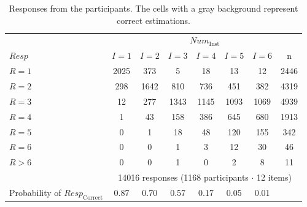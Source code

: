 \begin{table}[t]
\tiny
\begin{tabular}{p{1cm}ccccccc}
\toprule[1.5pt]
 & \multicolumn{ 7}{c}{$\textit{Num}_{\mathrm{Inst}}$} \\
  \cmidrule(l){2-8}
 $\textit{Resp}$ & $I=1$ & $I=2$ & $I=3$ & $ I=4$ & $I=5$ & $I=6$ & n \\

 \midrule
 $R=1$ & \cellcolor[gray]{0.9} 2025 & 373 & 5 & 18 & 13 & 12 & 2446 \\
 \midrule
 $R=2$ & 298 & \cellcolor[gray]{0.9} 1642 & 810 & 736 & 451 & 382 & 4319 \\
 \midrule
 $R=3$ & 12 & 277 & \cellcolor[gray]{0.9} 1343 & 1145 & 1093 & 1069 & 4939 \\
 \midrule
 $R=4$ & 1 & 43 & 158 & \cellcolor[gray]{0.9} 386 & 645 & 680 & 1913 \\
 \midrule
 $R=5$ & 0 & 1 & 18 & 48 & \cellcolor[gray]{0.9} 120 & 155 & 342 \\
 \midrule
 $R=6$ & 0 & 0 & 1 & 3 & 12 & \cellcolor[gray]{0.9} 30 & 46 \\
 \midrule
 $R>6$ & 0 & 0 & 1 & 0 & 2 & 8 & 11 \\

 \midrule
 & \multicolumn{7}{c}{14016 responses (1168 participants $\cdot$ 12 items)} \\
\midrule[1pt]

Probability of $\textit{Resp}_{\mathrm{Correct}}$ & 0.87 & 0.70 & 0.57 & 0.17 & 0.05 & 0.01 &  \\

 \bottomrule[1.5pt]
\end{tabular}
\caption{Responses from the participants. The cells with a gray background represent correct estimations.}
\label{table:responses}
\end{table}
\tabcolsep=6pt

